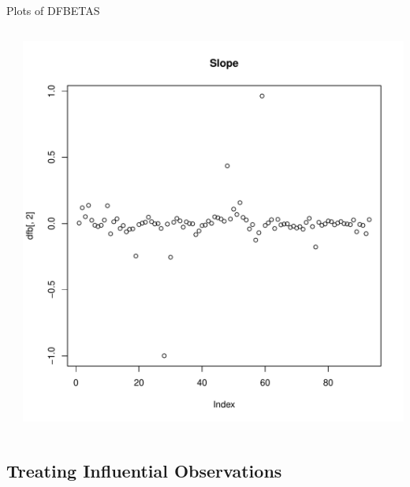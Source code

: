 \documentclass[10pt]{beamer}\usepackage[]{graphicx}\usepackage[]{color}
\makeatletter
\def\maxwidth{ %
  \ifdim\Gin@nat@width>\linewidth
    \linewidth
  \else
    \Gin@nat@width
  \fi
}
\newenvironment{knitrout}{}{} %
\makeatother
\begin{document}
\begin{frame}[fragile]{Plots of DFBETAS}
\begin{columns}
\begin{column}{0.5\textwidth}
\begin{knitrout}
{}


\end{knitrout}



\end{column}
\begin{column}{0.5\textwidth}

\begin{knitrout}\footnotesize
{}\color{fgcolor}

{\centering \includegraphics[width=\maxwidth]{figure/assumptions-unnamed-chunk-30-1} 

}


\end{knitrout}



\end{column}
\end{columns}

\end{frame}


\subsection{Treating Influential Observations}
\end{document}
